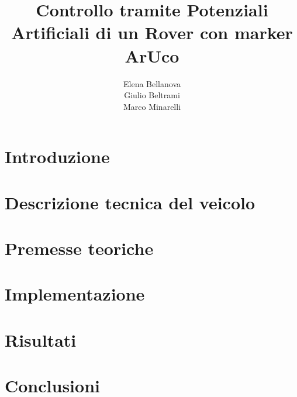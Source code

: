 \documentclass{article}
\title{Controllo tramite Potenziali Artificiali di un Rover con marker ArUco}
\author{Elena Bellanova \\ Giulio Beltrami \\ Marco Minarelli}
\date{}
\begin{document}


\tableofcontents

\clearpage
\section{Introduzione}


\section{Descrizione tecnica del veicolo} 


\section{Premesse teoriche}


\section{Implementazione}


\section{Risultati}


\section{Conclusioni}


\nocite{*}


\end{document}
